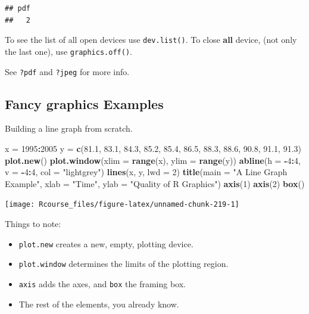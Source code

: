 \documentclass[]{book}
\newenvironment{Shaded}{\begin{snugshade}}{\end{snugshade}}
\newcommand{\KeywordTok}[1]{\textcolor[rgb]{0.13,0.29,0.53}{\textbf{#1}}}
\newcommand{\DataTypeTok}[1]{\textcolor[rgb]{0.13,0.29,0.53}{#1}}
\newcommand{\DecValTok}[1]{\textcolor[rgb]{0.00,0.00,0.81}{#1}}
\newcommand{\FloatTok}[1]{\textcolor[rgb]{0.00,0.00,0.81}{#1}}
\newcommand{\StringTok}[1]{\textcolor[rgb]{0.31,0.60,0.02}{#1}}
\newcommand{\OperatorTok}[1]{\textcolor[rgb]{0.81,0.36,0.00}{\textbf{#1}}}
\newcommand{\NormalTok}[1]{#1}
\providecommand{\tightlist}{%
  \setlength{\itemsep}{0pt}\setlength{\parskip}{0pt}}
\theoremstyle{definition}
\theoremstyle{definition}
\theoremstyle{definition}
\theoremstyle{remark}
\begin{document}
\begin{verbatim}
## pdf 
##   2
\end{verbatim}

To see the list of all open devices use \texttt{dev.list()}. To close
\textbf{all} device, (not only the last one), use
\texttt{graphics.off()}.

See \texttt{?pdf} and \texttt{?jpeg} for more info.

\subsection{Fancy graphics Examples}\label{fancy}

Building a line graph from scratch.

\begin{Shaded}
\begin{Highlighting}[]
\NormalTok{x =}\StringTok{ }\DecValTok{1995}\OperatorTok{:}\DecValTok{2005}
\NormalTok{y =}\StringTok{ }\KeywordTok{c}\NormalTok{(}\FloatTok{81.1}\NormalTok{, }\FloatTok{83.1}\NormalTok{, }\FloatTok{84.3}\NormalTok{, }\FloatTok{85.2}\NormalTok{, }\FloatTok{85.4}\NormalTok{, }\FloatTok{86.5}\NormalTok{, }\FloatTok{88.3}\NormalTok{, }\FloatTok{88.6}\NormalTok{, }\FloatTok{90.8}\NormalTok{, }\FloatTok{91.1}\NormalTok{, }\FloatTok{91.3}\NormalTok{)}
\KeywordTok{plot.new}\NormalTok{()}
\KeywordTok{plot.window}\NormalTok{(}\DataTypeTok{xlim =} \KeywordTok{range}\NormalTok{(x), }\DataTypeTok{ylim =} \KeywordTok{range}\NormalTok{(y))}
\KeywordTok{abline}\NormalTok{(}\DataTypeTok{h =} \OperatorTok{-}\DecValTok{4}\OperatorTok{:}\DecValTok{4}\NormalTok{, }\DataTypeTok{v =} \OperatorTok{-}\DecValTok{4}\OperatorTok{:}\DecValTok{4}\NormalTok{, }\DataTypeTok{col =} \StringTok{"lightgrey"}\NormalTok{)}
\KeywordTok{lines}\NormalTok{(x, y, }\DataTypeTok{lwd =} \DecValTok{2}\NormalTok{)}
\KeywordTok{title}\NormalTok{(}\DataTypeTok{main =} \StringTok{"A Line Graph Example"}\NormalTok{,}
        \DataTypeTok{xlab =} \StringTok{"Time"}\NormalTok{,}
        \DataTypeTok{ylab =} \StringTok{"Quality of R Graphics"}\NormalTok{)}
\KeywordTok{axis}\NormalTok{(}\DecValTok{1}\NormalTok{)}
\KeywordTok{axis}\NormalTok{(}\DecValTok{2}\NormalTok{)}
\KeywordTok{box}\NormalTok{()}
\end{Highlighting}
\end{Shaded}

\texttt{[image: Rcourse\_files/figure-latex/unnamed-chunk-219-1]}

Things to note:

\begin{itemize}
\tightlist
\item
  \texttt{plot.new} creates a new, empty, plotting device.
\item
  \texttt{plot.window} determines the limits of the plotting region.
\item
  \texttt{axis} adds the axes, and \texttt{box} the framing box.
\item
  The rest of the elements, you already know.
\end{itemize}
\end{document}
